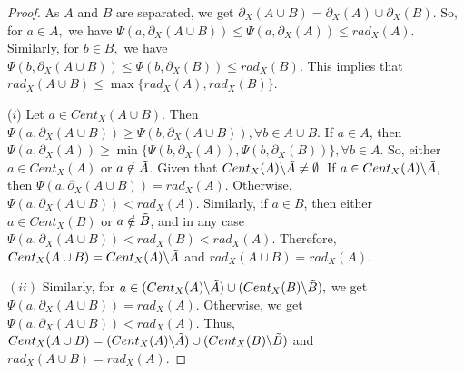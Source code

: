 \documentclass[12pt]{amsart}
\begin{document}
\begin{proof}
As $A$ and $B$ are separated, we get
$ \partial_{X}(A \cup B)= \partial_{X}(A) \cup \partial_{X}(B)$. So, for $a \in A,$ we have $\Psi(a,\partial_{X}(A\cup B))\leq \Psi(a,\partial_{X}(A))\leq rad_{X}(A).$ Similarly, for $b \in B,$ we have $ \Psi(b,\partial_{X}(A\cup B))\leq \Psi(b,\partial_{X}(B))\leq rad_{X}(B).$ This implies that $rad_{X}(A\cup B)\leq \max\{rad_{X}(A),rad_{X}(B)\}.$\par 
($i$) Let $a\in Cent_X(A\cup B)$. Then  $\Psi(a,\partial_{X}(A\cup B))\geq \Psi(b,\partial_{X}(A\cup B)),\forall b\in A\cup B.$ If $a\in A$, then $\Psi(a,\partial_{X}(A))\geq \min\{\Psi(b,\partial_{X}(A)),\Psi(b,\partial_{X}(B))\}, \forall b\in A$. So, either $a\in Cent_X(A)$ or $a\notin \Tilde{A}$. Given that  $Cent_{X}(A)\backslash\Tilde{A}\neq\emptyset$. If $a\in Cent_{X}(A)\backslash\Tilde{A}$, then $\Psi(a,\partial_{X}(A\cup B))=rad_X(A)$. Otherwise,  $\Psi(a,\partial_{X}(A\cup B))<rad_X(A)$.  Similarly, if $a\in B$, then either $a\in Cent_X(B)$ or $a\notin \Tilde{B}$, and in any case  $\Psi(a,\partial_{X}(A\cup B))<rad_X(B)<rad_X(A).$ Therefore, $Cent_X{(A\cup B)}= Cent_X(A)\backslash \Tilde{A}$ and $rad_{X}(A\cup B)=rad_{X}(A).$



$(ii)$ %
Similarly, for $a\in (Cent_{X}(A)\backslash \Tilde{A})\cup(Cent_{X}(B)\backslash \Tilde{B}),$ we get $\Psi(a,\partial_{X}(A\cup B))=rad_{X}(A).$ Otherwise, we get
$\Psi(a,\partial_{X}(A\cup B))<rad_{X}(A).$ Thus, $Cent_{X}(A\cup B)=(Cent_{X}(A)\backslash\Tilde{A}) \cup (Cent_{X}(B)\backslash\Tilde{B})$ and $rad_{X}(A\cup B)=rad_{X}(A).$
\end{proof}
\end{document}
